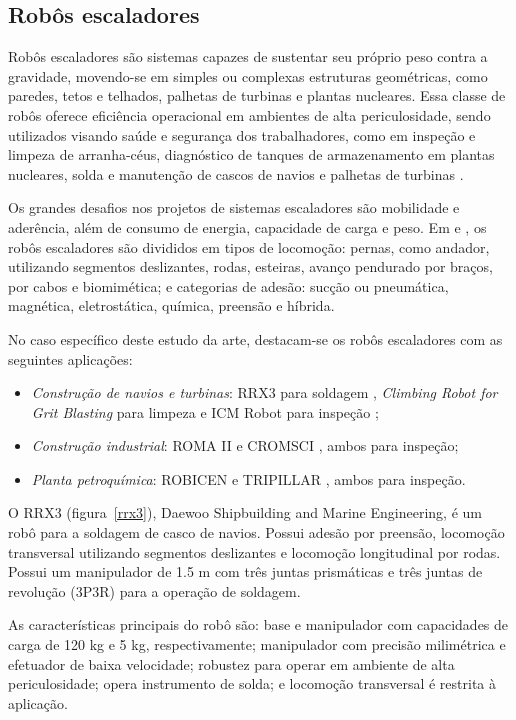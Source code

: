 \subsection{Robôs escaladores}\label{sota_climbers}
Robôs escaladores são sistemas capazes de sustentar seu próprio peso contra a
gravidade, movendo-se em simples ou complexas estruturas geométricas, como
paredes, tetos e telhados, palhetas de turbinas e plantas nucleares.
Essa classe de robôs oferece eficiência operacional em ambientes
de alta periculosidade, sendo utilizados visando saúde e segurança dos
trabalhadores, como em inspeção e limpeza de arranha-céus, diagnóstico de
tanques de armazenamento em plantas nucleares, solda e manutenção de cascos de
navios e palhetas de turbinas \cite{clawar}.

Os grandes desafios nos projetos de sistemas escaladores são mobilidade e
aderência, além de consumo de energia, capacidade de carga e peso. Em
\cite{modular}e \cite{climbsurv}, os robôs escaladores são divididos em tipos de locomoção:
pernas, como andador, utilizando segmentos deslizantes, rodas, esteiras, avanço
pendurado por braços, por cabos e biomimética; e categorias de adesão: sucção ou
pneumática, magnética, eletrostática, química, preensão e híbrida.

No caso específico deste estudo da arte, destacam-se os robôs escaladores com as
seguintes aplicações:

\begin{itemize}
  \item \emph{Construção de navios e turbinas}: RRX3 para soldagem
  \citep{rrx3}, \emph{Climbing Robot for Grit Blasting} para limpeza
  \citep{crgb} e ICM Robot para inspeção \citep{icm};
  \item \emph{Construção industrial}: ROMA II \citep{roma} e
  CROMSCI \citep{CROMSCI}, ambos para inspeção; 
 \item \emph{Planta petroquímica}: ROBICEN \citep{robicen} e
  TRIPILLAR \citep{tripillar}, ambos para inspeção.  
\end{itemize}

O RRX3 (figura~\ref{rrx3}), Daewoo Shipbuilding and Marine Engineering, é um
robô para a soldagem de casco de navios. Possui adesão por preensão, locomoção transversal utilizando segmentos deslizantes e locomoção
longitudinal por rodas. Possui um manipulador de 1.5 m com três juntas
prismáticas e três juntas de revolução (3P3R) para a operação de soldagem. 

As características principais do robô são: base e manipulador com
capacidades de carga de 120 kg e 5 kg, respectivamente; manipulador com precisão
milimétrica e efetuador de baixa velocidade; robustez para operar em ambiente de
alta periculosidade; opera instrumento de solda; e locomoção transversal é
restrita à aplicação.

